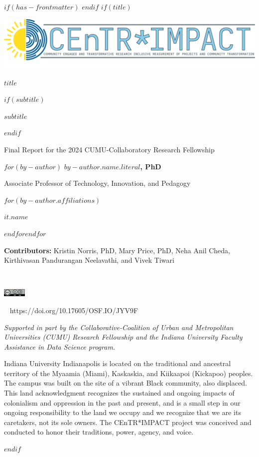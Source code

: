 $if(has-frontmatter)$
\frontmatter
$endif$
$if(title)$
\cleardoublepage
\thispagestyle{empty}
{\centering
\includegraphics[width=6in]{assets/images/centr-impact-logo.png}
{\Huge\sffamily\bfseries $title$ \par}
$if(subtitle)$
\vspace{3ex}
{\Large\sffamily\bfseries $subtitle$ \par}
$endif$
\vspace{1ex}
{\large Final Report for the 2024 CUMU-Collaboratory Research Fellowship \par}
\vspace{12ex}
$for(by-author)$
{\Large\bfseries $by-author.name.literal$, PhD  \\}
{Associate Professor of Technology, Innovation, and Pedagogy \par}
$for(by-author.affiliations)$%
{$it.name$ \par}
$endfor$$endfor$
{\textbf{Contributors:} Kristin Norris, PhD, Mary Price, PhD, Neha Anil Cheda, Kirthivasan Pandurangan Neelavathi, and Vivek Tiwari \par}
\vfill
{\textcolor{iucolor}{\aiOpenData} ~ ~ \textcolor{orange}{\aiOpenAccess} ~ ~ \textcolor{osfcolor}{\aiOSF} ~ ~ {\includegraphics[height=11pt]{assets/images/By-SA} \par}
{\textcolor{doicolor}{\aiDoi} ~ https://doi.org/10.17605/OSF.IO/JYV9F \par}
\vfill
{\small\textit{Supported in part by the Collaborative-Coalition of Urban and Metropolitan Universities (CUMU) Research Fellowship and the Indiana University Faculty Assistance in Data Science program.} \par}
\newpage
\null
{}
\vfill
{Indiana University Indianapolis is located on the traditional and ancestral territory of the Myaamia (Miami), Kaskaskia, and Kiikaapoi (Kickapoo) peoples. The campus was built on the site of a vibrant Black community, also displaced. This land acknowledgment recognizes the sustained and ongoing impacts of colonialism and oppression in the past and present, and is a small step in our ongoing responsibility to the land we occupy and we recognize that we are its caretakers, not its sole owners. The CEnTR*IMPACT project was conceived and conducted to honor their traditions, power, agency, and voice. \par}
}}
$endif$